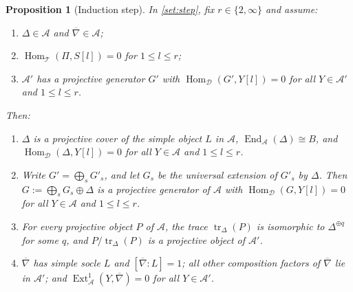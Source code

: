 \documentclass[11pt,reqno]{amsart}
\theoremstyle{plain}
\newtheorem{proposition}[theorem]{Proposition}
\theoremstyle{definition}
\theoremstyle{remark}
\DeclareMathOperator{\Hom}{Hom}
\DeclareMathOperator{\End}{End}
\DeclareMathOperator{\Ext}{Ext}
\DeclareMathOperator{\tr}{tr}
\newcommand{\nablabar}{\overline{\nabla}}
\newcommand{\cD}{\mathcal{D}}
\newcommand{\cA}{\mathcal{A}}
\newcommand{\cT}{\mathcal{T}}
\begin{document}
\begin{proposition}[Induction step]\label{prop:step}
In \cref{set:step}, fix $r\in\{2,\infty\}$ and assume:
\begin{enumerate}[label=\textup{(\roman*)}]
\item $\Delta\in\cA$ and $\nablabar\in\cA$;
\item $\Hom_\cT(\Pi,S[l])=0$ for $1\le l\le r$;
\item $\cA'$ has a projective generator $G'$ with $\Hom_\cD(G',Y[l])=0$ for all $Y\in\cA'$ and $1\le l\le r$.
\end{enumerate}
Then:
\begin{enumerate}
\item $\Delta$ is a projective cover of the simple object $L$ in $\cA$, $\End_\cA(\Delta)\cong B$, and $\Hom_\cD(\Delta,Y[l])=0$ for all $Y\in\cA$ and $1\le l\le r$.
\item Write $G'=\bigoplus_sG'_s$, and let $G_s$ be the universal extension of $G'_s$ by $\Delta$. Then $G:=\bigoplus_sG_s\oplus\Delta$ is a projective generator of $\cA$ with $\Hom_\cD(G,Y[l])=0$ for all $Y\in\cA$ and $1\le l\le r$.
\item For every projective object $P$ of $\cA$, the trace $\tr_\Delta(P)$ is isomorphic to $\Delta^{\oplus q}$ for some $q$, and $P/\tr_\Delta(P)$ is a projective object of $\cA'$.
\item $\nablabar$ has simple socle $L$ and $[\nablabar:L]=1$; all other composition factors of $\nablabar$ lie in $\cA'$; and $\Ext^1_\cA(Y,\nablabar)=0$ for all $Y\in\cA'$.
\end{enumerate}
\end{proposition}
\end{document}
